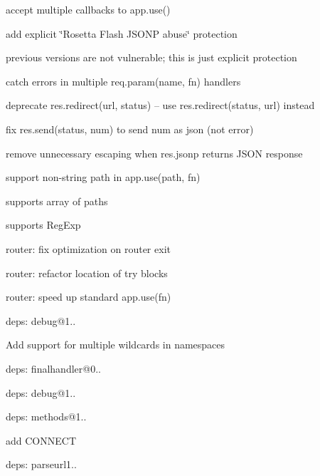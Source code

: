 \begin{DoxyItemize}
\item accept multiple callbacks to {\ttfamily app.\+use()}
\item add explicit \char`\"{}\+Rosetta Flash J\+S\+O\+N\+P abuse\char`\"{} protection
\begin{DoxyItemize}
\item previous versions are not vulnerable; this is just explicit protection
\end{DoxyItemize}
\item catch errors in multiple {\ttfamily req.\+param(name, fn)} handlers
\item deprecate {\ttfamily res.\+redirect(url, status)} -- use {\ttfamily res.\+redirect(status, url)} instead
\item fix {\ttfamily res.\+send(status, num)} to send {\ttfamily num} as json (not error)
\item remove unnecessary escaping when {\ttfamily res.\+jsonp} returns J\+S\+O\+N response
\item support non-\/string {\ttfamily path} in {\ttfamily app.\+use(path, fn)}
\begin{DoxyItemize}
\item supports array of paths
\item supports {\ttfamily Reg\+Exp}
\end{DoxyItemize}
\item router\+: fix optimization on router exit
\item router\+: refactor location of {\ttfamily try} blocks
\item router\+: speed up standard {\ttfamily app.\+use(fn)}
\item deps\+: debug@1..
\begin{DoxyItemize}
\item Add support for multiple wildcards in namespaces
\end{DoxyItemize}
\item deps\+: finalhandler@0..
\begin{DoxyItemize}
\item deps\+: debug@1..
\end{DoxyItemize}
\item deps\+: methods@1..
\begin{DoxyItemize}
\item add {\ttfamily C\+O\+N\+N\+E\+C\+T}
\end{DoxyItemize}
\item deps\+: parseurl1..

\end{DoxyItemize}
